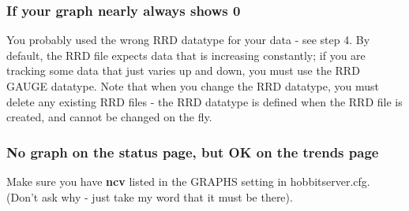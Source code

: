 \subsubsection{If your graph nearly always shows 0}


 You probably used the wrong RRD datatype for your data - see step 4. By default, the RRD file expects data that is increasing constantly; if you are tracking some data that just varies up and down, you must use the RRD GAUGE datatype. Note that when you change the RRD datatype, you must delete any existing RRD files - the RRD datatype is defined when the RRD file is created, and cannot be changed on the fly.
\subsubsection{No graph on the status page, but OK on the trends page}


 Make sure you have \textbf{ncv}
 listed in the GRAPHS setting in hobbitserver.cfg. (Don't ask why - just take my word that it must be there).

